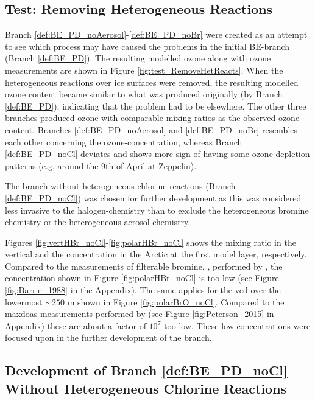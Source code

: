 \subsection{Test: Removing Heterogeneous Reactions}

Branch \ref{def:BE_PD_noAerosol}-\ref{def:BE_PD_noBr} were created as an attempt to see which process may have caused the problems in the initial BE-branch (Branch \ref{def:BE_PD}). The resulting modelled ozone along with ozone measurements are shown in Figure \ref{fig:test_RemoveHetReacts}. When the heterogeneous reactions over ice surfaces were removed, the resulting modelled ozone content became similar to what was produced originally (by Branch \ref{def:BE_PD}), indicating that the problem had to be elsewhere. The other three branches produced ozone with comparable mixing ratios as the observed ozone content. Branches \ref{def:BE_PD_noAerosol} and \ref{def:BE_PD_noBr} resembles each other concerning the ozone-concentration, whereas Branch \ref{def:BE_PD_noCl} deviates and shows more sign of having some ozone-depletion patterns (e.g. around the 9th of April at Zeppelin). 

\medskip

The branch without heterogeneous chlorine reactions (Branch \ref{def:BE_PD_noCl}) was chosen for further development as this was considered less invasive to the halogen-chemistry than to exclude the heterogeneous bromine chemistry or the heterogeneous aerosol chemistry. 

\medskip

Figures \ref{fig:vertHBr_noCl}-\ref{fig:polarHBr_noCl} shows the mixing ratio in the vertical and the concentration in the Arctic at the first model layer, respectively. Compared to the measurements of filterable bromine, , performed by \cite{barrie}, the concentration shown in Figure \ref{fig:polarHBr_noCl} is too low (see Figure \ref{fig:Barrie_1988} in the Appendix). The same applies for the  \acrshort{vcd} over the lowermost $\sim 250$ m shown in Figure \ref{fig:polarBrO_noCl}. Compared to the \acrshort{maxdoas}-measurements performed by \cite{Peterson2015} (see Figure \ref{fig:Peterson_2015} in Appendix) these are about a factor of $10^7$ too low. These low concentrations were focused upon in the further development of the branch. 



\subsection{Development of Branch \ref{def:BE_PD_noCl} Without Heterogeneous Chlorine Reactions}


